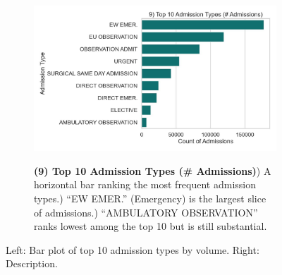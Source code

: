 \begin{figure}[ht!]
    \centering
    \begin{subfigure}{0.42\textwidth}
        \includegraphics[width=\linewidth]{mimic_plots/plot9.jpg}
    \end{subfigure}\hfill
    \begin{subfigure}{0.54\textwidth}
        \footnotesize
        \textbf{(9) Top 10 Admission Types (\# Admissions)}) A horizontal bar ranking the most frequent admission types.) “EW EMER.” (Emergency) is the largest slice of admissions.) “AMBULATORY OBSERVATION” ranks lowest among the top 10 but is still substantial.
    \end{subfigure}
    \caption{Left: Bar plot of top 10 admission types by volume. Right: Description.}
    \label{fig:plot9}
\end{figure}

